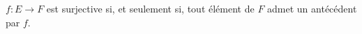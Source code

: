 $f:E\to F$ est surjective si, et seulement si, tout élément de $F$ admet un antécédent par $f$.

\begin{reponses}
\end{reponses}

